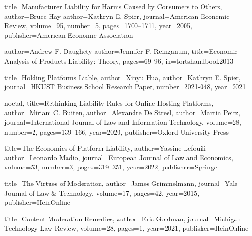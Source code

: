{
  title={Manufacturer Liability for Harms Caused by Consumers to Others},
  author={Bruce Hay}
  author={Kathryn E. Spier},
  journal={American Economic Review},
  volume={95},
  number={5},
  pages={1700--1711},
  year={2005},
  publisher={American Economic Association}
}


{
  author={Andrew F. Daughety}
  author={Jennifer F. Reinganum},
  title={Economic Analysis of Products Liability: Theory},
  pages={69--96},
  in={tortshandbook2013}
}



{
  title={Holding Platforms Liable},
  author={Xinyu Hua},
  author={Kathryn E. Spier},
  journal={HKUST Business School Research Paper},
  number={2021-048},
  year={2021}
}

{ noetal,
  title={Rethinking Liability Rules for Online Hosting Platforms},
  author={Miriam C. Buiten},
  author={Alexandre De Streel},
  author={Martin Peitz},
  journal={International Journal of Law and Information Technology},
  volume={28},
  number={2},
  pages={139--166},
  year={2020},
  publisher={Oxford University Press}
}

{
  title={The Economics of Platform Liability},
  author={Yassine Lefouili}
  author={Leonardo Madio},
  journal={European Journal of Law and Economics},
  volume={53},
  number={3},
  pages={319--351},
  year={2022},
  publisher={Springer}
}



{
  title={The Virtues of Moderation},
  author={James Grimmelmann},
  journal={Yale Journal of Law \& Technology},
  volume={17},
  pages={42},
  year={2015},
  publisher={HeinOnline}
}

{
  title={Content Moderation Remedies},
  author={Eric Goldman},
  journal={Michigan Technology Law Review},
  volume={28},
  pages={1},
  year={2021},
  publisher={HeinOnline}
}

